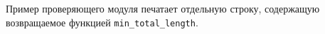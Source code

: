 Пример проверяющего модуля печатает отдельную строку, содержащую возвращаемое
функцией \texttt{min\_total\_length}.